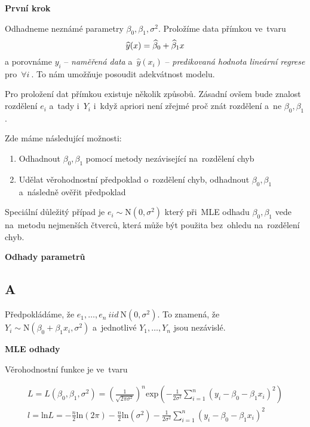 \textbf{První krok }

Odhadneme neznámé parametry $ \beta_{0}, \beta_{1}, \sigma^{2} $. Proložíme data přímkou ve~tvaru
$$
	\widehat{y}(x) = \widehat{\beta}_{0} + \widehat{\beta}_{1} x 
$$
a porovnáme $ y_{i} $ -- \textit{naměřená data} a~$ \widehat{y}(x_{i}) $ -- \textit{predikovaná hodnota lineární regrese} pro~$ \forall i~$. To nám umožňuje posoudit adekvátnost modelu.

Pro proložení dat přímkou existuje několik způsobů. Zásadní ovšem bude znalost rozdělení $ e_{i} $ a~tady i~$ Y_{i} $ i~když apriori není zřejmé proč znát rozdělení a~ne $ \beta_{0}, \beta_{1} $.

Zde máme následující možnosti:

\begin{enumerate}
  \item Odhadnout $ \beta_{0} , \beta_{1} $ pomocí metody nezávisející na~rozdělení chyb
  \item Udělat věrohodnostní předpoklad o~rozdělení chyb, odhadnout $ \beta_{0} , \beta_{1} $ a~následně ověřit předpoklad
\end{enumerate}


\begin{remark}
 Speciální důležitý případ je $ e_{i} \sim \text{N}(0,\sigma^{2}) $ který při~MLE odhadu $ \beta_{0}, \beta_{1} $ vede na~metodu nejmenších čtverců, která může být použita bez~ohledu na~rozdělení chyb.
\end{remark}

\textbf{Odhady parametrů}
\subsection{A}
Předpokládáme, že $ e_{1}, \dots , e_{n} ~iid~ \text{N}(0,\sigma^{2}) $. To znamená, že $ Y_{i} \sim \text{N}(\beta_{0} + \beta_{1} x_{i},\sigma^{2}) $ a~jednotlivé $ Y_{1}, \dots , Y_{n} $ jsou nezávislé.

\textbf{MLE odhady}

Věrohodnostní funkce je ve~tvaru

$$
\begin{aligned}
	L = L ( \beta_{0} , \beta_{1} , \sigma^{2} ) = \left( \frac{1}{ \sqrt{ 2 \pi \sigma^{2} }} \right) ^{n} \text{exp} \left( - \frac{1}{2 \sigma^{2} } \sum_{i = 1}^{n}( y_{i} -  \beta_{0}  - \beta_{1} x_{i} )^{2} \right) \\
l = \text{ln} L = -\frac{n}{2} \text{ln} ( 2 \pi ) -\frac{n}{2} \text{ln} (\sigma^{2} ) - \frac{1}{2 \sigma^{2} } \sum_{i = 1}^{n}( y_{i} -  \beta_{0}  - \beta_{1} x_{i})^{2}
\end{aligned}
$$

